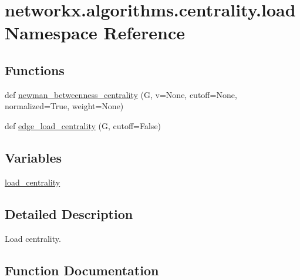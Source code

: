 \hypertarget{namespacenetworkx_1_1algorithms_1_1centrality_1_1load}{}\section{networkx.\+algorithms.\+centrality.\+load Namespace Reference}
\label{namespacenetworkx_1_1algorithms_1_1centrality_1_1load}
\subsection*{Functions}
\begin{DoxyCompactItemize}
\item 
def \hyperlink{namespacenetworkx_1_1algorithms_1_1centrality_1_1load_aa6e723e954aa51a2258ec99854f063c0}{newman\+\_\+betweenness\+\_\+centrality} (G, v=None, cutoff=None, normalized=True, weight=None)
\item 
def \hyperlink{namespacenetworkx_1_1algorithms_1_1centrality_1_1load_a2a022759465348a57b0a8a2a2c1371f6}{edge\+\_\+load\+\_\+centrality} (G, cutoff=False)
\end{DoxyCompactItemize}
\subsection*{Variables}
\begin{DoxyCompactItemize}
\item 
\hyperlink{namespacenetworkx_1_1algorithms_1_1centrality_1_1load_af4b6efad9f3076cd3eb5dad2beb4d36a}{load\+\_\+centrality}
\end{DoxyCompactItemize}


\subsection{Detailed Description}
\begin{DoxyVerb}Load centrality.\end{DoxyVerb}
 

\subsection{Function Documentation}
\mbox{\label{namespacenetworkx_1_1algorithms_1_1centrality_1_1load_a2a022759465348a57b0a8a2a2c1371f6}} 
